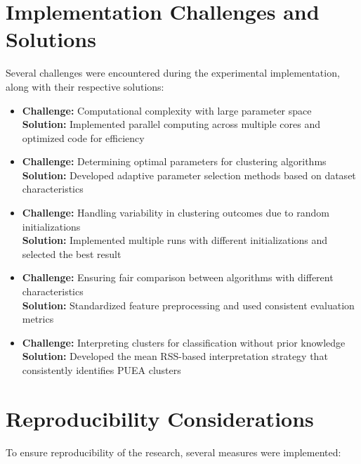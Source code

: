 \section{Implementation Challenges and Solutions}

Several challenges were encountered during the experimental implementation, along with their respective solutions:

\begin{itemize}
    \item \textbf{Challenge:} Computational complexity with large parameter space\\
    \textbf{Solution:} Implemented parallel computing across multiple cores and optimized code for efficiency
    
    \item \textbf{Challenge:} Determining optimal parameters for clustering algorithms\\
    \textbf{Solution:} Developed adaptive parameter selection methods based on dataset characteristics
    
    \item \textbf{Challenge:} Handling variability in clustering outcomes due to random initializations\\
    \textbf{Solution:} Implemented multiple runs with different initializations and selected the best result
    
    \item \textbf{Challenge:} Ensuring fair comparison between algorithms with different characteristics\\
    \textbf{Solution:} Standardized feature preprocessing and used consistent evaluation metrics
    
    \item \textbf{Challenge:} Interpreting clusters for classification without prior knowledge\\
    \textbf{Solution:} Developed the mean RSS-based interpretation strategy that consistently identifies PUEA clusters
\end{itemize}

\section{Reproducibility Considerations}

To ensure reproducibility of the research, several measures were implemented:

